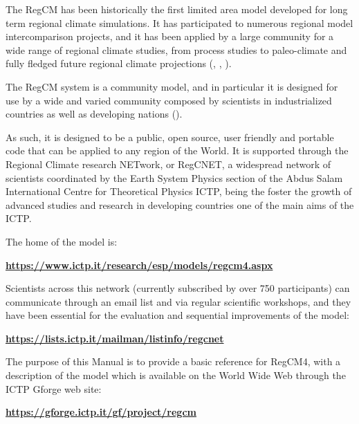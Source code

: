 The \ac{RegCM} has been historically the first limited area model
developed for long term regional climate simulations. It has participated to
numerous regional model intercomparison projects, and it has been applied by
a large community for a wide range of regional climate studies, from process
studies to paleo-climate and fully fledged future regional climate
projections (\cite{Giorgi_99}, \cite{Giorgi_06}, \cite{Giorgi_14}).

The \ac{RegCM} system is a community model, and in particular it is designed
for use by a wide and varied community composed by scientists in industrialized
countries as well as developing nations (\cite{Pal_07}).

As such, it is designed to be a public, open source, user friendly and portable
code that can be applied to any region of the World. It is supported through
the Regional Climate research NETwork, or RegCNET, a widespread network of
scientists coordinated by the Earth System Physics section of
the Abdus Salam International Centre for Theoretical Physics \ac{ICTP},
being the foster the growth of advanced studies and research in developing
countries one of the main aims of the \ac{ICTP}.

The home of the model is:

\begin{center}
	{\bf \url{https://www.ictp.it/research/esp/models/regcm4.aspx}}
\end{center}

Scientists across this network (currently subscribed by over 750 participants)
can communicate through an email list and via regular scientific workshops,
and they have been essential for the evaluation and sequential improvements of
the model:

\begin{center}
	{\bf \url{https://lists.ictp.it/mailman/listinfo/regcnet}}
\end{center}

The purpose of this Manual is to provide a basic reference for \ac{RegCM}4, with
a description of the model which is available on the World Wide Web through
the ICTP Gforge web site:

\begin{center}
	{\bf \url{https://gforge.ictp.it/gf/project/regcm}}
\end{center}

\vfill
